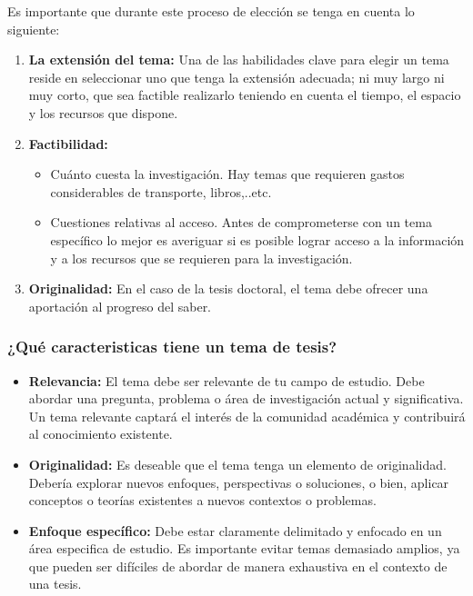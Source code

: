 \documentclass[
	11pt, %
]{beamer}
\begin{document}
\begin{frame}
  Es importante que durante este proceso de elección se tenga en cuenta lo siguiente:
  \bigskip %
  \begin{enumerate}
  \item \textbf{La extensión del tema:} Una de las habilidades clave para elegir un tema reside en seleccionar uno que tenga la extensión adecuada; ni muy largo ni muy corto, que sea factible realizarlo teniendo en cuenta el tiempo, el espacio y los recursos que dispone.
  \item \textbf{Factibilidad:}
    \begin{itemize}
    \item Cuánto cuesta la investigación. Hay temas que requieren gastos considerables de transporte, libros,..etc.
    \item Cuestiones relativas al acceso. Antes de comprometerse con un tema específico lo mejor es averiguar si es posible lograr acceso a la información y a los recursos que se requieren para la investigación.
    \end{itemize}
  \item \textbf{Originalidad:} En el caso de la tesis doctoral, el tema debe ofrecer una aportación al progreso del saber.
  \end{enumerate}
  
\end{frame}

\begin{frame}
  \frametitle{¿Qué caracteristicas tiene un tema de tesis?}
  \bigskip %
  
  \begin{itemize}
  \item \textbf{Relevancia:} El tema debe ser relevante de tu campo de estudio. Debe abordar una pregunta, problema o área de investigación actual y significativa. Un tema relevante captará el interés de la comunidad académica y contribuirá al conocimiento existente.
  \item \textbf{Originalidad:} Es deseable que el tema tenga un elemento de originalidad. Debería explorar nuevos enfoques, perspectivas o soluciones, o bien, aplicar conceptos o teorías existentes a nuevos contextos o problemas.
  \item \textbf{Enfoque específico:} Debe estar claramente delimitado y enfocado en un área especifica de estudio. Es importante evitar temas demasiado amplios, ya que pueden ser difíciles de abordar de manera exhaustiva en el contexto de una tesis.
  \end{itemize}
\end{frame}
\end{document}
